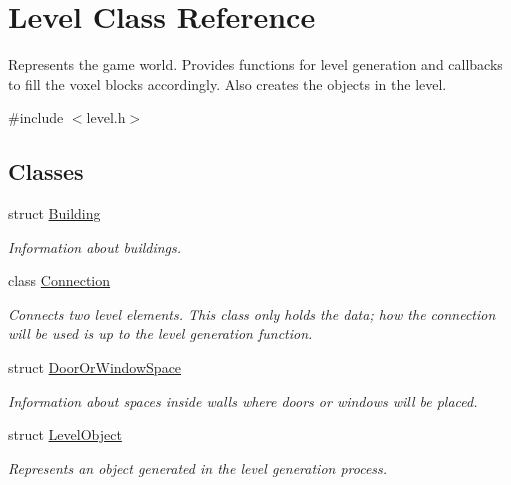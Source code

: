 \hypertarget{classLevel}{
\section{\-Level \-Class \-Reference}
\label{d2/d9d/classLevel}
}


\-Represents the game world. \-Provides functions for level generation and callbacks to fill the voxel blocks accordingly. \-Also creates the objects in the level.  




{\ttfamily \#include $<$level.\-h$>$}

\subsection*{\-Classes}
\begin{DoxyCompactItemize}
\item 
struct \hyperlink{structLevel_1_1Building}{\-Building}
\begin{DoxyCompactList}\small\item\em \-Information about buildings. \end{DoxyCompactList}\item 
class \hyperlink{classLevel_1_1Connection}{\-Connection}
\begin{DoxyCompactList}\small\item\em \-Connects two level elements. \-This class only holds the data; how the connection will be used is up to the level generation function. \end{DoxyCompactList}\item 
struct \hyperlink{structLevel_1_1DoorOrWindowSpace}{\-Door\-Or\-Window\-Space}
\begin{DoxyCompactList}\small\item\em \-Information about spaces inside walls where doors or windows will be placed. \end{DoxyCompactList}\item 
struct \hyperlink{structLevel_1_1LevelObject}{\-Level\-Object}
\begin{DoxyCompactList}\small\item\em \-Represents an object generated in the level generation process. \end{DoxyCompactList}\end{DoxyCompactItemize}
